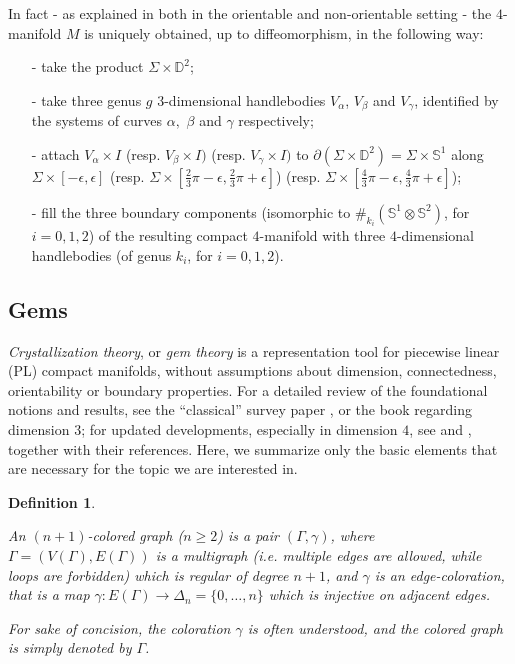 \documentclass[12pt,a4paper]{article}
\newtheorem{definition}{Definition}
\newcommand{\G}{\Gamma}
\newcommand{\g}{\gamma}
\begin{document}
In fact - as explained in \cite{Miller-Naylor} both in the orientable and non-orientable setting - the $4$-manifold $M$ is uniquely obtained, up to diffeomorphism, in the following way: 
 \begin{itemize}
\item[-]  take the product $\Sigma \times \mathbb D^2$; 
  \item[-] take three genus $g$ 3-dimensional handlebodies $V_\alpha$, $V_\beta$ and $V_\gamma$, identified by the systems of curves $\alpha,$ $\beta$ and $\gamma$ respectively; 
  \item[-]  attach $V_\alpha \times I$ (resp. $V_\beta \times I)$ (resp. $V_\gamma \times I)$ to $\partial (\Sigma \times \mathbb D^2) = \Sigma \times \mathbb S^1$ along $\Sigma \times [-\epsilon, \epsilon]$ (resp. $\Sigma \times [\frac 2 3 \pi -\epsilon, \frac 2 3 \pi + \epsilon]$)  (resp. $\Sigma \times [\frac 4 3 \pi -\epsilon, \frac 4 3 \pi + \epsilon]$);  
  \item[-]  fill the three boundary components (isomorphic to $\#_{k_i}(\mathbb S^1 \otimes \mathbb S^2)$, for $i=0,1,2$) of the resulting compact $4$-manifold with three $4$-dimensional handlebodies (of genus $k_i$, for $i=0,1,2$).       
\end{itemize}


\bigskip 

\subsection{Gems} \label{preliminaries.gems}   

\smallskip 

{\it Crystallization theory}, or {\it gem theory} is a representation tool for piecewise linear (PL) compact manifolds, without assumptions about dimension, connectedness, orientability or boundary properties. 
For a detailed review of the foundational notions and results, see the ``classical'' survey paper \cite{Ferri-Gagliardi-Grasselli}, or the book 
\cite{Lins-book} regarding dimension $3$; for updated developments, especially in dimension $4$, see \cite{generalized-genus} and \cite{Casali-Cristofori-Gagliardi RIMUT 2020}, together with their references. 
Here, we summarize only the basic elements that are necessary for the topic we are interested in. 

\medskip 

\begin{definition} \label{$n+1$-colored graph} {\em An $(n+1)${\emph{-colored graph}}  ($n \ge 2$) is a pair $(\G,\g)$, where $\G=(V(\G), E(\G))$ is a multigraph (i.e. multiple edges are allowed, while loops are forbidden)  which is regular of degree  $n+1$, and $\g$ is an {\it edge-coloration}, that is a map  $\g: E(\G) \rightarrow \Delta_n=\{0,\ldots, n\}$ which is injective on adjacent edges.

For sake of concision, the coloration $\gamma$ is often understood, and the colored graph is simply denoted by $\G$. } \end{definition}
\end{document}
